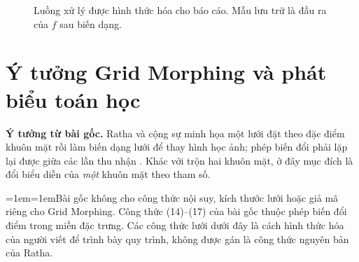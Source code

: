 \documentclass[11pt,a4paper]{article}
\newcommand{\Score}{\operatorname{sim}}
\newcommand{\note}[1]{\par\begingroup\small\color{teal!65!black}\leftskip=1em\rightskip=1em\noindent#1\par\endgroup}
\begin{document}
\begin{figure}[!ht]
\centering
{}
\caption{Luồng xử lý được hình thức hóa cho báo cáo. Mẫu lưu trữ là đầu ra của $f$ sau biến dạng.}
\end{figure}

\newpage
\section{Ý tưởng Grid Morphing và phát biểu toán học}
\textbf{Ý tưởng từ bài gốc.} Ratha và cộng sự minh họa một lưới đặt theo đặc điểm khuôn mặt rồi làm biến dạng lưới để thay hình học ảnh; phép biến đổi phải lặp lại được giữa các lần thu nhận \cite[tr.~629--630, Hình~10]{ratha}. Khác với trộn hai khuôn mặt, ở đây mục đích là đổi biểu diễn của \emph{một} khuôn mặt theo tham số.

\note{Bài gốc không cho công thức nội suy, kích thước lưới hoặc giả mã riêng cho Grid Morphing. Công thức (14)--(17) của bài gốc thuộc phép biến đổi điểm trong miền đặc trưng. Các công thức lưới dưới đây là cách hình thức hóa của người viết để trình bày quy trình, không được gán là công thức nguyên bản của Ratha.}
\end{document}
